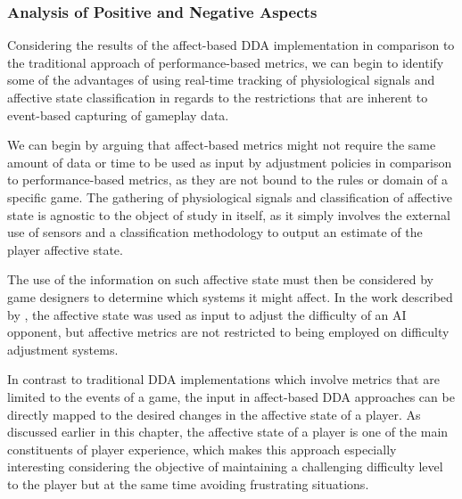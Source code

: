 \subsubsection{Analysis of Positive and Negative Aspects}

Considering the results of the affect-based DDA implementation in comparison to the traditional approach of performance-based metrics, we can begin to identify some of the advantages of using real-time tracking of physiological signals and affective state classification in regards to the restrictions that are inherent to event-based capturing of gameplay data.

We can begin by arguing that affect-based metrics might not require the same amount of data or time to be used as input by adjustment policies in comparison to performance-based metrics, as they are not bound to the rules or domain of a specific game. The gathering of physiological signals and classification of affective state is agnostic to the object of study in itself, as it simply involves the external use of sensors and a classification methodology to output an estimate of the player affective state.

The use of the information on such affective state must then be considered by game designers to determine which systems it might affect. In the work described by \citet{article_affectivedda}, the affective state was used as input to adjust the difficulty of an AI opponent, but affective metrics are not restricted to being employed on difficulty adjustment systems.

 In contrast to traditional DDA implementations which involve metrics that are limited to the events of a game, the input in affect-based DDA approaches can be directly mapped to the desired changes in the affective state of a player. As discussed earlier in this chapter, the affective state of a player is one of the main constituents of player experience, which makes this approach especially interesting considering the objective of maintaining a challenging difficulty level to the player but at the same time avoiding frustrating situations.  

